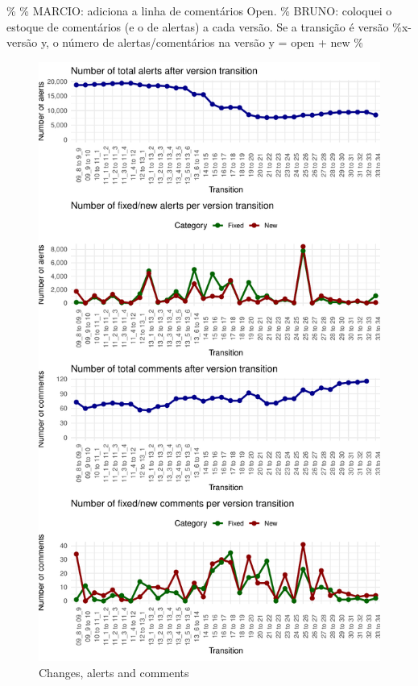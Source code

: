 \documentclass[
]{article}
\begin{document}
\% \% MARCIO: adiciona a linha de comentários Open. \% BRUNO: coloquei o
estoque de comentários (e o de alertas) a cada versão. Se a transição é
versão \%x-versão y, o número de alertas/comentários na versão y = open
+ new \%

\small

\normalsize

\small

\begin{figure}
\centering
\includegraphics{report_files/figure-latex/unnamed-chunk-20-1.pdf}
\caption{\label{timeseries}Changes, alerts and comments}
\end{figure}
\end{document}
